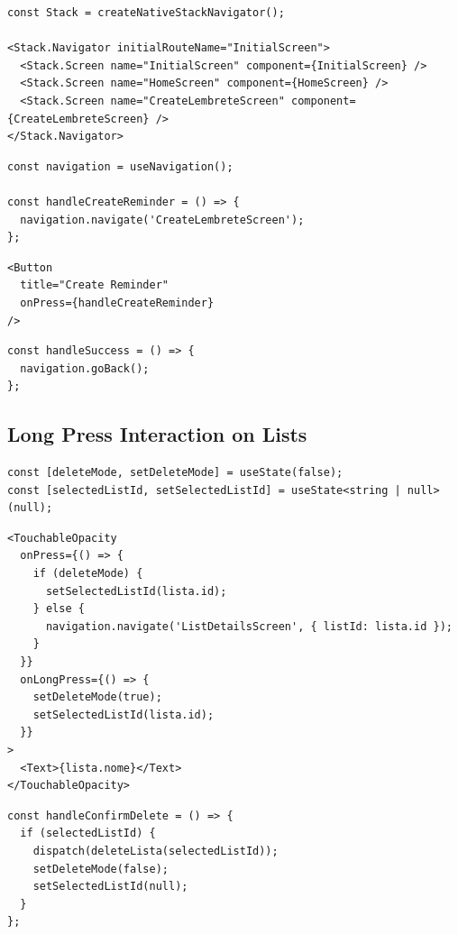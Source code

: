 \documentclass[runningheads,a4paper]{llncs}
\begin{document}
\begin{lstlisting}[caption={Stack Navigator Configuration}]
const Stack = createNativeStackNavigator();

<Stack.Navigator initialRouteName="InitialScreen">
  <Stack.Screen name="InitialScreen" component={InitialScreen} />
  <Stack.Screen name="HomeScreen" component={HomeScreen} />
  <Stack.Screen name="CreateLembreteScreen" component={CreateLembreteScreen} />
</Stack.Navigator>
\end{lstlisting}

\begin{lstlisting}[caption={Navigation Trigger from UI Interaction}]
const navigation = useNavigation();

const handleCreateReminder = () => {
  navigation.navigate('CreateLembreteScreen');
};
\end{lstlisting}

\begin{lstlisting}[caption={Navigation Button Component}]
<Button
  title="Create Reminder"
  onPress={handleCreateReminder}
/>
\end{lstlisting}

\begin{lstlisting}[caption={Returning to Previous Screen After Success}]
const handleSuccess = () => {
  navigation.goBack();
};
\end{lstlisting}

\subsection{Long Press Interaction on Lists}

\begin{lstlisting}[caption={UI State for Delete Mode Control}]
const [deleteMode, setDeleteMode] = useState(false);
const [selectedListId, setSelectedListId] = useState<string | null>(null);
\end{lstlisting}

\begin{lstlisting}[caption={Short Press vs Long Press Gesture Handling}]
<TouchableOpacity
  onPress={() => {
    if (deleteMode) {
      setSelectedListId(lista.id);
    } else {
      navigation.navigate('ListDetailsScreen', { listId: lista.id });
    }
  }}
  onLongPress={() => {
    setDeleteMode(true);
    setSelectedListId(lista.id);
  }}
>
  <Text>{lista.nome}</Text>
</TouchableOpacity>
\end{lstlisting}

\begin{lstlisting}[caption={Deletion Confirmation and State Reset}]
const handleConfirmDelete = () => {
  if (selectedListId) {
    dispatch(deleteLista(selectedListId));
    setDeleteMode(false);
    setSelectedListId(null);
  }
};
\end{lstlisting}
\end{document}
